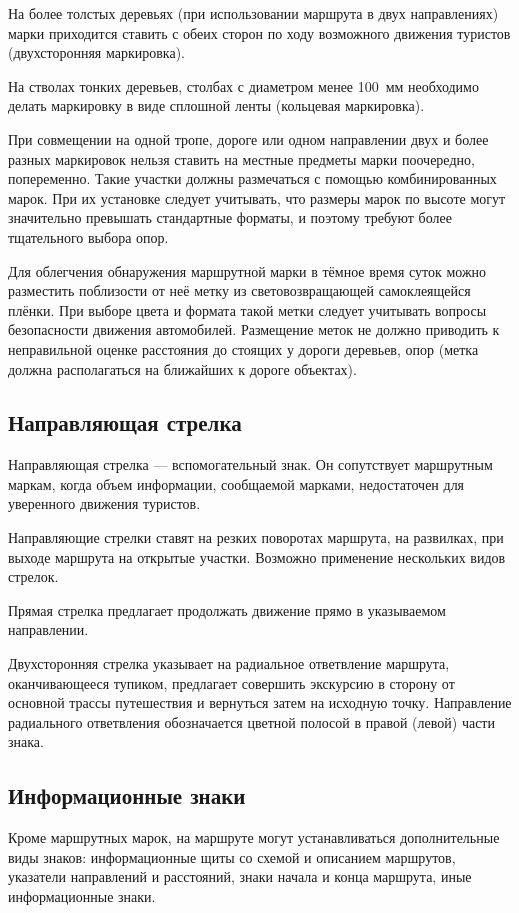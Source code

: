 \documentclass[a4paper,12pt]{extarticle}
\begin{document}
На более толстых деревьях (при использовании маршрута в двух направлениях) марки приходится ставить с обеих сторон по
ходу возможного движения туристов (двухсторонняя маркировка).

На стволах тонких деревьев, столбах с диаметром менее 100~мм необходимо делать маркировку в виде сплошной ленты
(кольцевая маркировка).

При совмещении на одной тропе, дороге или одном направлении двух и более разных маркировок нельзя ставить на местные
предметы марки поочередно, попеременно. Такие участки должны размечаться с помощью комбинированных марок. При их
установке следует учитывать, что размеры марок по высоте могут значительно превышать стандартные форматы, и поэтому
требуют более тщательного выбора опор.

Для облегчения обнаружения маршрутной марки в тёмное время суток можно разместить поблизости от неё метку из световозвращающей самоклеящейся
плёнки. При выборе цвета и формата такой метки следует учитывать вопросы безопасности движения автомобилей. Размещение
меток не должно приводить к неправильной оценке расстояния до стоящих у дороги деревьев, опор
(метка должна располагаться на ближайших к дороге объектах).

\subsection{Направляющая стрелка}
Направляющая стрелка --- вспомогательный знак. Он сопутствует маршрутным маркам, когда объем информации, сообщаемой
марками, недостаточен для уверенного движения туристов.

Направляющие стрелки ставят на резких поворотах маршрута, на развилках, при выходе маршрута на открытые участки.
Возможно применение нескольких видов стрелок.

Прямая стрелка предлагает продолжать движение прямо в указываемом направлении.

Двухсторонняя стрелка указывает на радиальное ответвление маршрута, оканчивающееся тупиком, предлагает
совершить экскурсию в сторону от основной трассы путешествия и вернуться затем на исходную точку. Направление
радиального ответвления обозначается цветной полосой в правой (левой) части знака.

\subsection{Информационные знаки}
Кроме маршрутных марок, на маршруте могут устанавливаться дополнительные виды знаков: информационные щиты со схемой и
описанием маршрутов, указатели направлений и расстояний, знаки начала и конца маршрута, иные информационные знаки.
\end{document}
